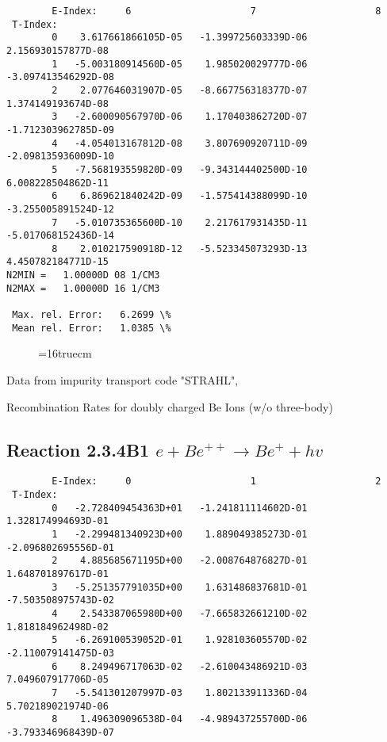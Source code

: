 \documentclass[12pt,dvipdfmx]{article}
\begin{document}
{\begin{small}
\begin{verbatim}
        E-Index:     6                     7                     8
 T-Index:
        0    3.617661866105D-05   -1.399725603339D-06    2.156930157877D-08
        1   -5.003180914560D-05    1.985020029777D-06   -3.097413546292D-08
        2    2.077646031907D-05   -8.667756318377D-07    1.374149193674D-08
        3   -2.600090567970D-06    1.170403862720D-07   -1.712303962785D-09
        4   -4.054013167812D-08    3.807690920711D-09   -2.098135936009D-10
        5   -7.568193559820D-09   -9.343144402500D-10    6.008228504862D-11
        6    6.869621840242D-09   -1.575414388099D-10   -3.255005891524D-12
        7   -5.010735365600D-10    2.217617931435D-11   -5.017068152436D-14
        8    2.010217590918D-12   -5.523345073293D-13    4.450782184771D-15
N2MIN =   1.00000D 08 1/CM3
N2MAX =   1.00000D 16 1/CM3

 Max. rel. Error:   6.2699 \%
 Mean rel. Error:   1.0385 \%

\end{verbatim}\end{small}
\begin{figure} \label{2.3.4B0}
\epsfxsize=16truecm
\end{figure}
\newpage
Data from impurity transport code "STRAHL", \cite{kn:Behringer}

  Recombination Rates for doubly charged Be Ions (w/o three-body)
\subsection{
Reaction 2.3.4B1  $e + Be^{++} \rightarrow Be^+ + hv$
}

\begin{small}\begin{verbatim}
        E-Index:     0                     1                     2
 T-Index:
        0   -2.728409454363D+01   -1.241811114602D-01    1.328174994693D-01
        1   -2.299481340923D+00    1.889049385273D-01   -2.096802695556D-01
        2    4.885685671195D+00   -2.008764876827D-01    1.648701897617D-01
        3   -5.251357791035D+00    1.631486837681D-01   -7.503508975743D-02
        4    2.543387065980D+00   -7.665832661210D-02    1.818184962498D-02
        5   -6.269100539052D-01    1.928103605570D-02   -2.110079141475D-03
        6    8.249496717063D-02   -2.610043486921D-03    7.049607917706D-05
        7   -5.541301207997D-03    1.802133911336D-04    5.702189021974D-06
        8    1.496309096538D-04   -4.989437255700D-06   -3.793346968439D-07


\end{verbatim}
\end{small}}
\end{document}
